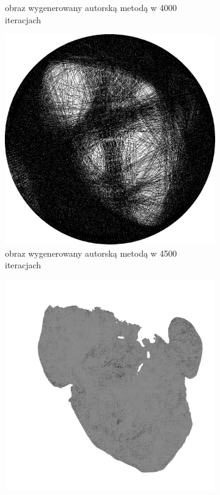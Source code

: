 \begin{figure}[H]
\begin{subfigure}{0.23\textwidth}
            \caption{obraz wygenerowany autorską metodą w 4000 iteracjach}
            \label{comp-comp-magdalene-f}
        \end{subfigure}
        \begin{subfigure}{0.23\textwidth}
            \centering
            \includegraphics[width = \textwidth]{img/6-comp/magdalene_e_i4500_c20_inv0_bg1_obj10_ed1.png}
            \caption{obraz wygenerowany autorską metodą w 4500 iteracjach}
            \label{comp-comp-magdalene-g}
        \end{subfigure}
        \begin{subfigure}{0.23\textwidth}
            \centering
            \includegraphics[width = \textwidth]{img/6-comp/magdalene_mask_c20_inv0_bg1_obj10_ed10.png}

\end{subfigure}
\end{figure}
